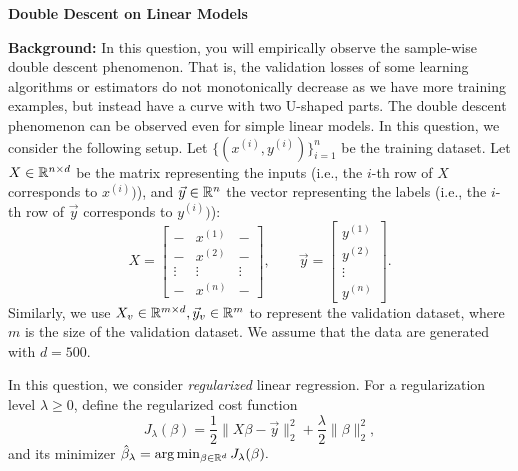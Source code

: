 \item {} {\bf Double Descent on Linear Models}


\textbf{Background: } 
In this question, you will empirically observe the sample-wise double descent phenomenon. That is, the validation losses of some learning algorithms or estimators do not monotonically decrease as we have more training examples, but instead have a curve with two U-shaped parts. The double descent phenomenon can be observed even for simple linear models. In this question, we consider the following setup. Let $\{(x^{(i)},y^{(i)})\}_{i=1}^{n}$ be the training dataset. Let $X\in\mathbb{R}^{n\times d}$ be the matrix representing the inputs (i.e., the $i$-th row of $X$ corresponds to $x^{(i)})$), and $\vec{y}\in\mathbb{R}^{n}$ the vector representing the labels (i.e., the $i$-th row of $\vec{y}$ corresponds to $y^{(i)})$):
$$
X=
\begin{bmatrix}
	- & x^{(1)} & - \\
	- & x^{(2)} & - \\
	\vdots & \vdots & \vdots\\
	- & x^{(n)} & - 
\end{bmatrix},\qquad
\vec{y}=
\begin{bmatrix}
	y^{(1)} \\
	y^{(2)}\\
	\vdots\\
	y^{(n)}
\end{bmatrix}.
$$
Similarly, we use $X_v\in \mathbb{R}^{m\times d}, \vec{y}_v\in \mathbb{R}^{m}$ to represent the validation dataset, where $m$ is the size of the validation dataset. We assume that the data are generated with $d=500$. 

In this question, we consider \emph{regularized} linear regression. For a regularization level $\lambda\ge 0$, define the regularized cost function $$J_\lambda(\beta)=\frac{1}{2}\|X\beta-\vec{y}\|_2^2+\frac{\lambda}{2}\|\beta\|_2^2,$$ and its minimizer $\hat{\beta}_\lambda=\arg\min_{\beta\in \mathbb{R}^{d}}J_\lambda(\beta).$

\begin{enumerate}
 	
	\ifnum{} {
	
} \fi


\ifnum{} {
	
} \fi

	
	\ifnum{} {
	
	} \fi

\end{enumerate}
